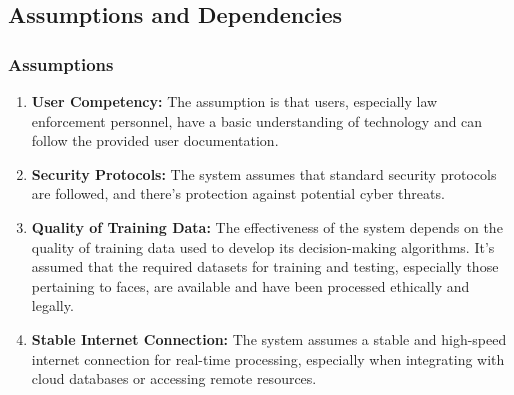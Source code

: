     \subsection{Assumptions and Dependencies}
        \subsubsection{Assumptions}
            \begin{enumerate}
                \item \textbf{User Competency:} The assumption is that users, especially law enforcement personnel, have a basic understanding of technology and can follow the provided user documentation.
                \item \textbf{Security Protocols:} The system assumes that standard security protocols are followed, and there's protection against potential cyber threats.
                \item \textbf{Quality of Training Data:} The effectiveness of the system depends on the quality of training data used to develop its decision-making algorithms. It's assumed that the required datasets for training and testing, especially those pertaining to faces, are available and have been processed ethically and legally.
                \item \textbf{Stable Internet Connection:} The system assumes a stable and high-speed internet connection for real-time processing, especially when integrating with cloud databases or accessing remote resources.
            \end{enumerate}
